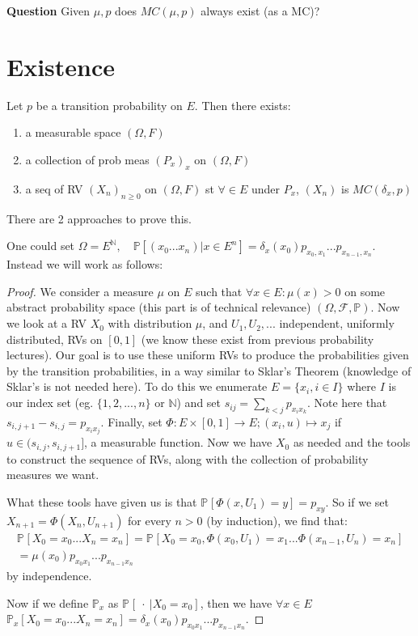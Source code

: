 \textbf{Question} Given $\mu, p$ does $MC(\mu, p)$ always exist (as a MC)?

\section{Existence}

\begin{theorem}
	Let $p$ be a transition probability on $E$. Then there exists:
\begin{enumerate}
	\item a measurable space $(\Omega, F)$
	\item a collection of prob meas $(P_x)_{x}$ on $(\Omega, F)$
	\item a seq of RV $(X_n)_{n \geq 0}$ on $(\Omega, F)$ st $\forall \in E$ under $P_x$, $(X_n)$ is  $MC(\delta_x, p)$
\end{enumerate}

\end{theorem}

There are 2 approaches to prove this. 

One could set $\Omega = E^{\mathbb{N}}, \quad \mathbb{P} \left[ (x_0...x_n) | x \in E^n \right] = \delta_x(x_0) p_{x_0,x_1}...p_{x_{n-1},x_n}$.
Instead we will work as follows:
\begin{proof}
	We consider a measure $\mu $ on $E$ such that $\forall x \in E: \mu (x) >0$ on some abstract probability space (this part is of technical relevance) $(\Omega, \mathcal{F}, \mathbb{P} )$. Now we look at a RV $X_0$ with distribution $\mu$, and $U_1,U_2,...$ independent, uniformly distributed, RVs on $[0,1]$ (we know these exist from previous probability lectures). Our goal is to use these uniform RVs to produce the probabilities given by the transition probabilities, in a way similar to Sklar's Theorem (knowledge of Sklar's is not needed here). To do this we enumerate $E=\{x_i, i \in I \}$ where $I$ is our index set (eg. $\{1,2,...,n\}$ or  $\mathbb{N}$) and set $s_{ij}= \sum_{k<j}p_{x_ix_k} $. Note here that $s_{i,j+1}-s_{i,j} = p_{x_ix_j} $. Finally, set $\Phi: E \times [0,1] \to E; (x_i,u) \mapsto x_j $ if $u \in (s_{i,j}, s_{i,j+1}]$, a measurable function. Now we have $X_0$ as needed and the tools to construct the sequence of RVs, along with the collection of probability measures we want.

	What these tools have given us is that $\mathbb{P}_{} \left[\Phi(x,U_1) = y  \right] = p_{xy}$. So if we set $X_{n+1} = \Phi(X_n, U_{n+1})$ for every $n>0$ (by induction), we find that:
\begin{gather}
	\mathbb{P}_{} \left[ X_0=x_0...X_n=x_n \right] = \mathbb{P}_{} \left[ X_0=x_0, \Phi(x_0, U_1)=x_1 ... \Phi(x_{n-1}, U_{n}) = x_n \right] \\
	= \mu(x_0)p_{x_0x_1}...p_{x_{n-1}x_n}
\end{gather}
by independence.

Now if we define $\mathbb{P}_{x} $ as $\mathbb{P}_{} \left[\ \cdot\ | X_0 = x_0 \right] $, then we have $\forall x \in E$ $\mathbb{P}_{x} \left[ X_0=x_0...X_n=x_n \right] = \delta_x(x_0)p_{x_0x_1}...p_{x_{n-1}x_n}$.


\end{proof}


